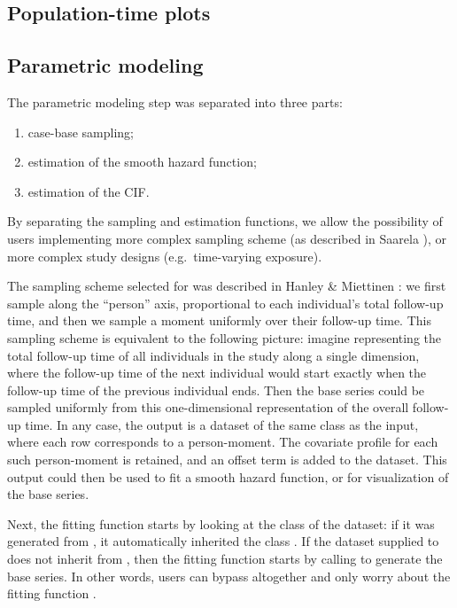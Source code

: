 \documentclass[
]{jss}
\providecommand{\tightlist}{%
  \setlength{\itemsep}{0pt}\setlength{\parskip}{0pt}}
\begin{document}
\hypertarget{population-time-plots}{%
\subsection{Population-time plots}\label{population-time-plots}}

\hypertarget{parametric-modeling}{%
\subsection{Parametric modeling}\label{parametric-modeling}}

The parametric modeling step was separated into three parts:

\begin{enumerate}
\def\labelenumi{\arabic{enumi}.}
\tightlist
\item
  case-base sampling;
\item
  estimation of the smooth hazard function;
\item
  estimation of the CIF.
\end{enumerate}

By separating the sampling and estimation functions, we allow the
possibility of users implementing more complex sampling scheme (as
described in Saarela \citeyearpar{saarela2016case}), or more complex
study designs (e.g.~time-varying exposure).

The sampling scheme selected for  was described in
Hanley \& Miettinen \citeyearpar{hanley2009fitting}: we first sample
along the ``person'' axis, proportional to each individual's total
follow-up time, and then we sample a moment uniformly over their
follow-up time. This sampling scheme is equivalent to the following
picture: imagine representing the total follow-up time of all
individuals in the study along a single dimension, where the follow-up
time of the next individual would start exactly when the follow-up time
of the previous individual ends. Then the base series could be sampled
uniformly from this one-dimensional representation of the overall
follow-up time. In any case, the output is a dataset of the same class
as the input, where each row corresponds to a person-moment. The
covariate profile for each such person-moment is retained, and an offset
term is added to the dataset. This output could then be used to fit a
smooth hazard function, or for visualization of the base series.

Next, the fitting function  starts by looking at
the class of the dataset: if it was generated from
, it automatically inherited the class
. If the dataset supplied to  does
not inherit from , then the fitting function starts by
calling  to generate the base series. In other
words, users can bypass  altogether and only worry
about the fitting function .
\end{document}
